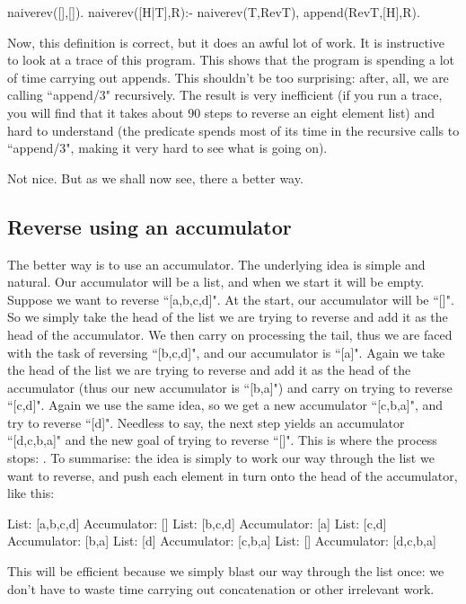 \begin{LPNcodedisplay}
naiverev([],[]).
naiverev([H|T],R):- naiverev(T,RevT), append(RevT,[H],R).
\end{LPNcodedisplay}

Now, this definition is correct, but it does an awful lot of work.
It is  instructive to look at a trace of this program.  This
shows that the program is spending a lot of time carrying out appends.
This shouldn't be too surprising: after, all, we are calling
``append/3" recursively.  The result is very
inefficient (if you run a trace, you will find that it takes about 90
steps to reverse an eight element list) and hard to understand (the
predicate spends most of its time in the recursive calls to
``append/3", making it very hard to see what is going on).

Not nice. But as we shall now see, there  a better way.



\subsection*{Reverse using an accumulator}\label{SUBSEC.L6.REVERSE.ACC}

The better way is to use an accumulator.  The underlying idea is
simple and natural.  Our accumulator will be a list, and when we start
it will be empty.  Suppose we want to reverse ``[a,b,c,d]".  At
the start, our accumulator will be ``[]".  So we simply take the
head of the list we are trying to reverse and add it as the head of
the accumulator.  We then carry on processing the tail, thus we are
faced with the task of reversing ``[b,c,d]", and our accumulator
is ``[a]".  Again we take the head of the list we are trying to
reverse and add it as the head of the accumulator (thus our new
accumulator is ``[b,a]") and carry on trying to reverse ``[c,d]".
Again we use the same idea, so we get a new accumulator
``[c,b,a]", and try to reverse ``[d]".  Needless to say, the
next step yields an accumulator ``[d,c,b,a]" and the new goal of
trying to reverse ``[]".  This is where the process stops: .  To summarise:
the idea is simply to work our way through the list we want to
reverse, and push each element in turn onto the head of the
accumulator, like this:
\begin{LPNcodedisplay}
List: [a,b,c,d]  Accumulator: []
List: [b,c,d]    Accumulator: [a]
List: [c,d]      Accumulator: [b,a]
List: [d]        Accumulator: [c,b,a]
List: []         Accumulator: [d,c,b,a]
\end{LPNcodedisplay}
This will be efficient because we simply blast our way through the list once:
we don't have to waste time carrying out concatenation or other
irrelevant work.

